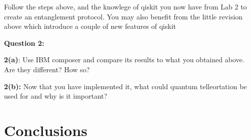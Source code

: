 Follow the steps above, and the knowlege of qiskit you now have from Lab 2 to create an entanglement protocol. You may also benefit from the little revision above which introduce a couple of new features of qiskit

\textbf{Question 2:}

\textbf{2(a)}: Use IBM composer and compare its results to what you obtained above. Are they different? How so?

\textbf{2(b):} Now that you have implemented it, what could quantum telleortation be used for and why is it important?

\section{Conclusions}